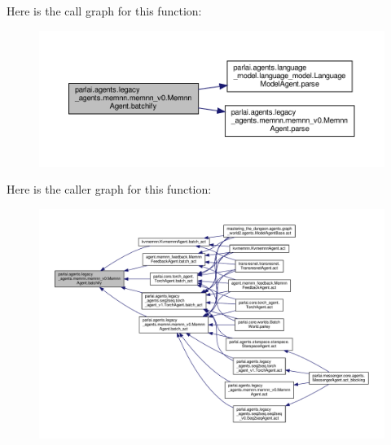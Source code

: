 Here is the call graph for this function\+:
\nopagebreak
\begin{figure}[H]
\begin{center}
\leavevmode
\includegraphics[width=350pt]{classparlai_1_1agents_1_1legacy__agents_1_1memnn_1_1memnn__v0_1_1MemnnAgent_afaa379fa31bcc83bd467d15e2976d0a3_cgraph}
\end{center}
\end{figure}
Here is the caller graph for this function\+:
\nopagebreak
\begin{figure}[H]
\begin{center}
\leavevmode
\includegraphics[width=350pt]{classparlai_1_1agents_1_1legacy__agents_1_1memnn_1_1memnn__v0_1_1MemnnAgent_afaa379fa31bcc83bd467d15e2976d0a3_icgraph}
\end{center}
\end{figure}
\mbox{\label{classparlai_1_1agents_1_1legacy__agents_1_1memnn_1_1memnn__v0_1_1MemnnAgent_ae18c65a307c2a3c164beb6cf0bb5b62b}} 
